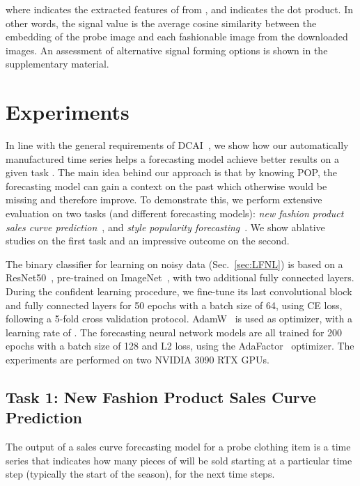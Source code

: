 \documentclass[runningheads]{llncs}
\newcommand{\snamebig}[0] {POP\xspace}
\begin{document}
where  indicates the extracted features of  from , and   indicates the dot product. In other words, the signal value  is the average cosine similarity between the embedding of the probe image  and each fashionable image  from the  downloaded images. An assessment of alternative signal forming options is shown in the supplementary material. 
\section{Experiments}
\label{sec:experiments}
In line with the general requirements of DCAI~\cite{motamedi2021data}, we show how our automatically manufactured time series helps a forecasting model  achieve better results on a given task . The main idea behind our approach is that by knowing \snamebig, the forecasting model can gain a context on the past which otherwise would be missing and therefore improve. To demonstrate this, we perform extensive evaluation on two tasks (and different forecasting models): \emph{new fashion product sales curve prediction}~\cite{singh_fashion_2019,ekambaram_attention_2020,skenderi2021well}, and \emph{style popularity forecasting}~\cite{al2017fashion}. We show ablative studies on the first task and an impressive outcome on the second.

The binary classifier  for learning on noisy data (Sec.~\ref{sec:LFNL}) is based on a ResNet50~\cite{he2015deep}, pre-trained on ImageNet~\cite{imagenet}, with two additional fully connected layers. During the confident learning procedure, we fine-tune its last convolutional block and fully connected layers for 50 epochs with a batch size of 64, using CE loss, following a 5-fold cross validation protocol. AdamW~\cite{loshchilov2018decoupled} is used as optimizer, with a learning rate of . The forecasting neural network models are all trained for 200 epochs with a batch size of 128 and L2 loss, using the AdaFactor~\cite{shazeer2018adafactor} optimizer. The experiments are performed on two NVIDIA 3090 RTX GPUs. 


\subsection{Task 1: New Fashion Product Sales Curve Prediction}\label{subsec:task1}
The output of a sales curve forecasting model for a probe clothing item  is a time series
 that indicates how many pieces of  will be sold starting at a particular time step  (typically the start of the season), for the next  time steps.
\end{document}
